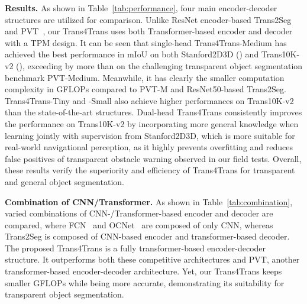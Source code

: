\documentclass[10pt,twocolumn,letterpaper]{article}
\begin{document}
\noindent\textbf{Results.}
As shown in Table~\ref{tab:performance}, four main encoder-decoder structures are utilized for comparison.
Unlike ResNet encoder-based Trans2Seg~\cite{xie2021segmenting} and PVT~\cite{pvt}, our Trans4Trans uses both Transformer-based encoder and decoder with a TPM design.
It can be seen that single-head Trans4Trans-Medium has achieved the best performance in mIoU on both Stanford2D3D () and Trans10K-v2 (), exceeding by more than  on the challenging transparent object segmentation benchmark \wrt PVT-Medium. Meanwhile, it has clearly the smaller computation complexity in GFLOPs compared to PVT-M and ResNet50-based Trans2Seg.
Trans4Trans-Tiny and -Small also achieve higher performances on Trans10K-v2 than the state-of-the-art structures.
Dual-head Trans4Trans consistently improves the performance on Trans10K-v2 by incorporating more general knowledge when learning jointly with supervision from Stanford2D3D, which is more suitable for real-world navigational perception, as it highly prevents overfitting and reduces false positives of transparent obstacle warning observed in our field tests. Overall, these results verify the superiority and efficiency of Trans4Trans for transparent and general object segmentation.

\noindent\textbf{Combination of CNN/Transformer.}
As shown in Table~\ref{tab:combination}, varied combinations of CNN-/Transformer-based encoder and decoder are compared, where FCN~\cite{fcn} and OCNet~\cite{ocnet} are composed of only CNN, whereas Trans2Seg is composed of CNN-based encoder and transformer-based decoder. The proposed Trans4Trans is a fully transformer-based encoder-decoder structure. It outperforms both these competitive architectures and PVT, another transformer-based encoder-decoder architecture. Yet, our Trans4Trans keeps smaller GFLOPs while being more accurate, demonstrating its suitability for transparent object segmentation.
\end{document}
